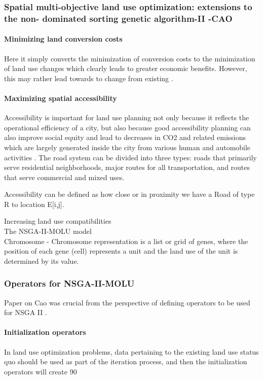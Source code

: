 \documentclass[twoside,10pt]{article}
\begin{document}
\subsubsection{Spatial multi-objective land use optimization: extensions to the  non- dominated sorting genetic algorithm-II -CAO}
\paragraph*{Minimizing land conversion costs}
Here it simply converts the minimization of conversion costs to the minimization of land use changes which clearly leads to greater economic benefits. However, this may rather lead towards to change from existing .

\paragraph*{Maximizing spatial accessibility}
Accessibility is important for land use planning not only because it reflects the operational efficiency of a city, but also because good accessibility planning can also improve social equity and lead to decreases in CO2 and related emissions which are largely generated inside the city from various human and automobile activities . The road system can be divided into three types:
roads that primarily serve residential neighborhoods, major routes for all transportation,
and routes that serve commercial and mixed uses.

Accessibility can be defined as how close or in proximity we have a Road of type R to location E[i,j].

Increasing land use compatibilities \\[.15cm]

The NSGA-II-MOLU model \\
Chromosome - Chromosome representation is a list or grid of genes, where the position of each
gene (cell) represents a unit and the land use of the unit is determined by its value.


\subsubsection*{Operators for NSGA-II-MOLU}
Paper on Cao was crucial from the perspective of defining operators to be used for NSGA II . \\
\paragraph*{Initialization operators}
In land use optimization problems, data pertaining to the existing land use status quo should be used as part of the iteration process, and then the initialization operators will create 90%
\end{document}
